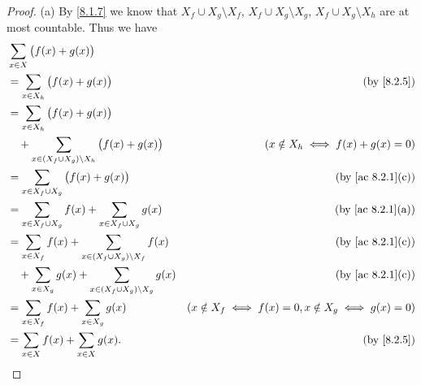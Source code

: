 \begin{proof}{(a)}
  By \cref{8.1.7} we know that \(X_f \cup X_g \setminus X_f\), \(X_f \cup X_g \setminus X_g\), \(X_f \cup X_g \setminus X_h\) are at most countable.
  Thus we have
  \begin{align*}
     & \sum_{x \in X} \big(f(x) + g(x)\big)                                                                                                      \\
     & = \sum_{x \in X_h} \big(f(x) + g(x)\big)                                       & \text{(by \cref{8.2.5})}                                 \\
     & = \sum_{x \in X_h} \big(f(x) + g(x)\big)                                                                                                  \\
     & \quad + \sum_{x \in (X_f \cup X_g) \setminus X_h} \big(f(x) + g(x)\big)        & (x \notin X_h \iff f(x) + g(x) = 0)                      \\
     & = \sum_{x \in X_f \cup X_g} \big(f(x) + g(x)\big)                              & \text{(by \cref{ac 8.2.1}(c))}                           \\
     & = \sum_{x \in X_f \cup X_g} f(x) + \sum_{x \in X_f \cup X_g} g(x)              & \text{(by \cref{ac 8.2.1}(a))}                           \\
     & = \sum_{x \in X_f} f(x) + \sum_{x \in (X_f \cup X_g) \setminus X_f} f(x)       & \text{(by \cref{ac 8.2.1}(c))}                           \\
     & \quad + \sum_{x \in X_g} g(x) + \sum_{x \in (X_f \cup X_g) \setminus X_g} g(x) & \text{(by \cref{ac 8.2.1}(c))}                           \\
     & = \sum_{x \in X_f} f(x) + \sum_{x \in X_g} g(x)                                & (x \notin X_f \iff f(x) = 0, x \notin X_g \iff g(x) = 0) \\
     & = \sum_{x \in X} f(x) + \sum_{x \in X} g(x).                                   & \text{(by \cref{8.2.5})}
  \end{align*}
\end{proof}

